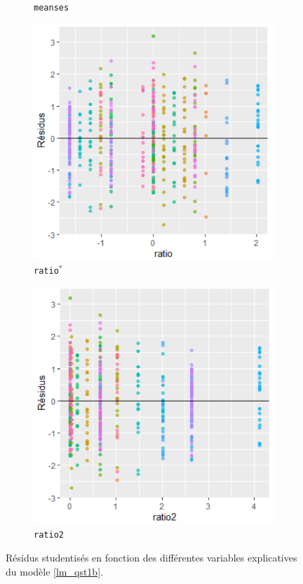 \documentclass{article}
\begin{document}
\begin{figure}[H]
\begin{subfigure}{0.48\textwidth}
		\caption{\texttt{meanses}}
		\label{Residus_VS_meanses}
	\end{subfigure}
	\begin{subfigure}{0.48\textwidth}
		\includegraphics[width=1\textwidth]{graphiques/Residus_VS_ratio_qst1b}
		\caption{\texttt{ratio}$^*$}
		\label{Residus_VS_ratio_qst1b}
	\end{subfigure}
	\begin{subfigure}{0.48\textwidth}
		\includegraphics[width=1\textwidth]{graphiques/Residus_VS_ratio2_qst1b}
		\caption{\texttt{ratio2}}
		\label{Residus_VS_ratio2_qst1b}
	\end{subfigure}
	\caption{Résidus studentisés en fonction des différentes variables explicatives du modèle \ref{lm_qst1b}.}
	\label{Residus_VS_variables_qst1b}
\end{figure}
\end{document}
